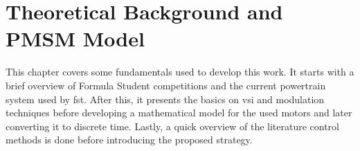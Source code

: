 
\chapter{Theoretical Background and PMSM Model}
\label{chapter:background}%

\minitoc%

This chapter covers some fundamentals used to develop this work. It starts with a brief overview of Formula Student competitions and the current powertrain system used by \gls{fst}. After this, it presents the basics on \gls{vsi} and modulation techniques before developing a mathematical model for the used motors and later converting it to discrete time. Lastly, a quick overview of the literature control methods is done before introducing the proposed strategy.



